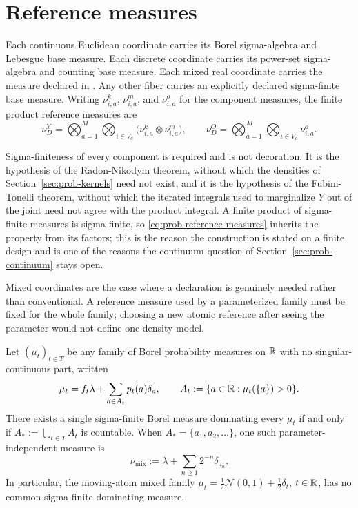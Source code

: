\section{Reference measures}
\label{sec:prob-reference}

\medskip
{}
Each continuous Euclidean coordinate carries its Borel sigma-algebra and Lebesgue base measure. Each discrete coordinate carries its power-set sigma-algebra and counting base measure. Each mixed real coordinate carries the measure declared in . Any other fiber carries an explicitly declared sigma-finite base measure. Writing $\nu^{k}_{i,a}$, $\nu^{m}_{i,a}$, and $\nu^{o}_{i,a}$ for the component measures, the finite product reference measures are
\begin{equation}
\nu^{Y}_{D}=\bigotimes_{a=1}^{M}\bigotimes_{i\in V_a}\bigl(\nu^{k}_{i,a}\otimes\nu^{m}_{i,a}\bigr),
\qquad
\nu^{O}_{D}=\bigotimes_{a=1}^{M}\bigotimes_{i\in V_a}\nu^{o}_{i,a}.
\label{eq:prob-reference-measures}
\end{equation}
\medskip

Sigma-finiteness of every component is required and is not decoration. It is the hypothesis of the Radon-Nikodym theorem, without which the densities of Section~\ref{sec:prob-kernels} need not exist, and it is the hypothesis of the Fubini-Tonelli theorem, without which the iterated integrals used to marginalize $Y$ out of the joint need not agree with the product integral. A finite product of sigma-finite measures is sigma-finite, so \eqref{eq:prob-reference-measures} inherits the property from its factors; this is the reason the construction is stated on a finite design and is one of the reasons the continuum question of Section~\ref{sec:prob-continuum} stays open.

Mixed coordinates are the case where a declaration is genuinely needed rather than conventional.  A reference measure used by a parameterized family must be fixed for the whole family; choosing a new atomic reference after seeing the parameter would not define one density model.

\medskip
{}
Let $(\mu_t)_{t\in T}$ be any family of Borel probability measures on $\mathbb R$ with no singular-continuous part, written
\[
\mu_t=f_t\lambda+\sum_{a\in A_t}p_t(a)\delta_a,
\qquad
A_t:=\{a\in\mathbb R:\mu_t(\{a\})>0\}.
\]
There exists a single sigma-finite Borel measure dominating every $\mu_t$ if and only if $A_*:=\bigcup_{t\in T}A_t$ is countable. When $A_*=\{a_1,a_2,\ldots\}$, one such parameter-independent measure is
\begin{equation}
\nu_{\mathrm{mix}}
:=\lambda+\sum_{n\geq1}2^{-n}\delta_{a_n}.
\label{eq:prob-mixed-family-reference}
\end{equation}
In particular, the moving-atom mixed family $\mu_t=\tfrac12\mathcal N(0,1)+\tfrac12\delta_t$, $t\in\mathbb R$, has no common sigma-finite dominating measure. 
\medskip

